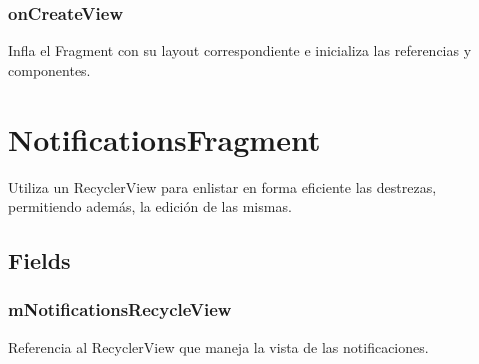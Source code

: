 \documentclass[letterpaper,10pt,english]{sphinxmanual}
\begin{document}
\subsubsection{onCreateView}
\label{Fragments/AddContactFragment:oncreateview}

\begin{fulllineitems}
\label{Fragments/AddContactFragment:com.fiuba.tallerii.jobify.AddContactFragment.onCreateView(LayoutInflater, ViewGroup, Bundle)}
Infla el Fragment con su layout correspondiente e inicializa las referencias y componentes.

\end{fulllineitems}



\section{NotificationsFragment}
\label{Fragments/NotificationsFragment:notificationsfragment}\label{Fragments/NotificationsFragment::doc}

\begin{fulllineitems}
\label{Fragments/NotificationsFragment:com.fiuba.tallerii.jobify.NotificationsFragment}
Utiliza un RecyclerView para enlistar en forma eficiente las destrezas, permitiendo además, la edición de las mismas.

\end{fulllineitems}



\subsection{Fields}
\label{Fragments/NotificationsFragment:fields}

\subsubsection{mNotificationsRecycleView}
\label{Fragments/NotificationsFragment:mnotificationsrecycleview}

\begin{fulllineitems}
\label{Fragments/NotificationsFragment:com.fiuba.tallerii.jobify.NotificationsFragment.mNotificationsRecycleView}
Referencia al RecyclerView que maneja la vista de las notificaciones.

\end{fulllineitems}
\end{document}
